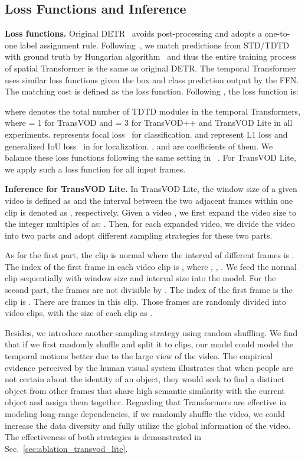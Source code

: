 \documentclass[10pt,journal,compsoc]{IEEEtran}
\begin{document}
\subsection{Loss Functions and Inference } 
\label{sec:loss_inference}
\noindent
\textbf{Loss functions.}
Original DETR~\cite{detr} avoids post-processing and adopts a one-to-one label assignment rule. Following~\cite{stewart2016end, detr, zhu2020deformable}, we match predictions from STD/TDTD with ground truth by Hungarian algorithm~\cite{kuhn1955hungarian} and thus the entire training process of spatial Transformer is the same as original DETR. 
The temporal Transformer uses similar loss functions given the box and class prediction output by the FFN. The matching cost is defined as the loss function. Following \cite{detr, zhu2020deformable, sun2021sparse}, the loss function is:

where  denotes the total number of TDTD modules in the temporal Transformers, where  = 1 for TransVOD and  = 3 for TransVOD++ and TransVOD Lite in all experiments. 
 represents focal loss~\cite{FocalLoss} for classification.  and  represent L1 loss and generalized IoU loss~\cite{GIoU} in for localization. ,  and  are coefficients of them. We balance these loss functions following the same setting in ~\cite{zhu2020deformable}.
For TransVOD Lite, we apply such a loss function for all input frames.

\noindent
\textbf{Inference for TransVOD Lite.}
In TransVOD Lite, the window size of a given video is defined as  and the interval between the two adjacent frames within one clip is denoted as , respectively.  Given a video , we first expand the video size to the integer multiples of  as: . Then, for each expanded video, we divide the video into two parts and adopt different sampling strategies for these two parts. 

As for the first part, the clip is normal where the interval of different frames is .
The index of the first frame in each video clip is , where ,  , . We feed the normal clip sequentially with window size  and interval size  into the model. For the second part, the frames are not divisible by . The index of the first frame is the clip is . There are  frames in this clip. Those frames are randomly divided into  video clips, with the size of each clip as .  

Besides, we introduce another sampling strategy using random shuffling.
We find that if we first randomly shuffle  and split it to  clips, our model could model the temporal motions better due to the large view of the video. The empirical evidence perceived by the human visual system illustrates that when people are not certain about the identity of an object, they would seek to find a distinct object from other
frames that share high semantic similarity with the current object and assign them together. Regarding that Transformers are effective in modeling long-range dependencies, if we randomly shuffle the video, we could increase the data diversity and fully utilize the global information of the video. The effectiveness of both strategies is demonstrated in Sec.~\ref{sec:ablation_transvod_lite}.
\end{document}
